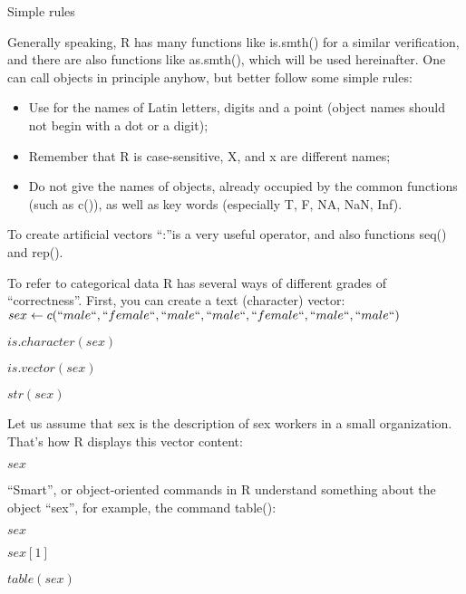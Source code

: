 \documentclass{beamer}
\begin{document}
\begin{frame}{Simple rules}

Generally speaking, R has many functions like is.smth() for a similar verification, and there are also functions like as.smth(), which will be used hereinafter. One can call objects in principle anyhow, but better follow some simple rules:
\begin{itemize}
\item Use for the names of Latin letters, digits and a point (object names should not begin with a dot or a digit);

\item Remember that R is case-sensitive, X, and x are different names;

\item Do not give the names of objects, already occupied by the common functions (such as c()), as well as key words (especially T, F, NA, NaN, Inf).
\end{itemize}
To create artificial vectors “:”is a very useful operator, and also functions seq() and rep().
\end{frame}


\begin{frame}{}
To refer to categorical data R has several ways of different grades of “correctness”. First, you can create a text (character) vector:
\
$sex \leftarrow c(``male``, ``female``, ``male``, ``male``, ``female``, ``male``, ``male``)$


$is.character(sex)$

$is.vector(sex)$

$str(sex)$

\end{frame}

\begin{frame}{}

Let us assume that sex is the description of sex workers in a small organization. 
That's how R displays this vector content:
\begin{center}
$sex$
\end{center}
\end{frame}


\begin{frame}{}
“Smart”, or object-oriented commands in R understand something about the object “sex”, for example, the command table():
\begin{center}

$sex$ 

$sex[1]$

$table(sex)$

\end{center}
\end{frame}
\end{document}

